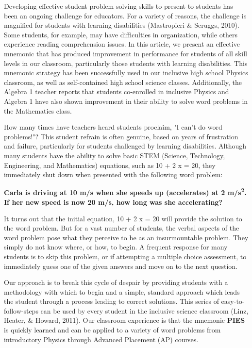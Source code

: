 \documentclass[11.5pt]{sig-alternate} %
\begin{document}
\begin{large}
    
Developing effective student problem solving skills to present to students has been an ongoing challenge for educators.  For a variety of reasons, the challenge is magnified for students with learning disabilities (Mastropieri \& Scruggs, 2010).  Some students, for example, may have difficulties in organization, while others experience reading comprehension issues.  In this article, we present an effective mnemonic that has produced improvement in performance for students of all skill levels in our classroom, particularly those students with learning disabilities. This mnemonic strategy has been successfully used in our inclusive high school Physics classroom, as well as self-contained high school science classes.  Additionally, the Algebra 1 teacher reports that students co-enrolled in inclusive Physics and Algebra 1 have also shown improvement in their ability to solve word problems in the Mathematics class.

How many times have teachers heard students proclaim, "I can't do word problems!"?   This student refrain is often genuine, based on years of frustration and failure, particularly for students challenged by learning disabilities. Although many students have the ability to solve basic STEM (Science, Technology, Engineering, and Mathematics) equations, such as 10 + 2 x = 20, they immediately shut down when presented with the following word problem:   

\textbf{Carla is driving at 10 m/s when she speeds up (accelerates) at 2 m/s\textsuperscript{2}. If her new speed is now 20 m/s, how long was she accelerating?}

It turns out that the initial equation, 10 + 2 x = 20 will provide the solution to the word problem.  But for a vast number of students, the verbal aspects of the word problem pose what they perceive to be as an insurmountable problem.  They simply do not know where, or how, to begin.  A frequent response for many students is to skip this problem, or if attempting a multiple choice assessment, to immediately guess one of the given answers and move on to the next question.   

Our approach is to break this cycle of despair by providing students with a methodology with which to begin and a simple, standard approach which leads the student through a process leading to correct solutions.  This series of easy-to-follow-steps can be used by every student in the inclusive science classroom (Linz, Heater, \& Howard, 2011). Our classroom experience is that the mnemonic \textbf{PIES} is quickly learned and can be applied to a variety of word problems from introductory Physics through Advanced Placement (AP) courses.


\end{large}
\end{document}
